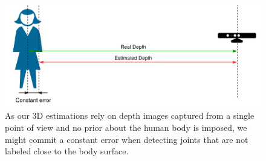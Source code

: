 \begin{figure}[h]
    \centering
    \includegraphics[width=\textwidth]{figures/thickness.png}
    \caption{As our 3D estimations rely on depth images captured from a single point of view and no prior about the human body is imposed, we might commit a constant error when detecting joints that are not labeled close to the body surface.}
    \label{fig:thickness}
\end{figure}

